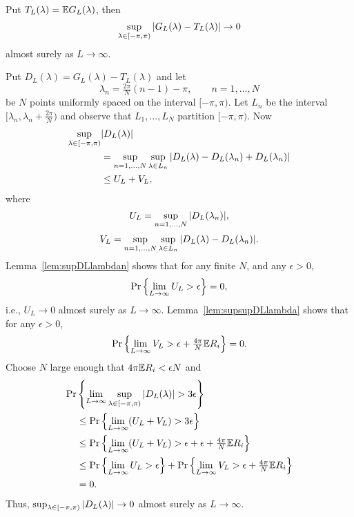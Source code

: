 \documentclass[journal]{IEEEtran}
\begin{document}
\begin{lemma}\label{lem:uniflawTGL} 
Put $T_L(\lambda) = {\mathbb E} G_L(\lambda)$, then
\[
\sup_{\lambda \in [-\pi, \pi)}{\vert G_L(\lambda) - T_L(\lambda) \vert} \rightarrow 0
\] 
almost surely as $L \rightarrow \infty$.
\end{lemma}
\begin{IEEEproof}
Put $D_L(\lambda) = G_L(\lambda) - T_L(\lambda)$ and let
\[
\lambda_n = \tfrac{2\pi}{N}(n-1) - \pi, \qquad n = 1, \dots, N
\]
be $N$ points uniformly spaced on the interval $[-\pi, \pi)$.  Let $L_n$ be the interval $[\lambda_n, \lambda_n + \tfrac{2\pi}{N})$ and observe that $L_1, \dots, L_N$ partition $[-\pi, \pi)$.  Now
\begin{align*}
\sup_{\lambda \in [-\pi, \pi)}&{\vert D_L(\lambda) \vert} \\
&= \sup_{n = 1,\dots,N}\sup_{\lambda \in L_n}{\vert D_L(\lambda) - D_L(\lambda_n) + D_L(\lambda_n) \vert} \\
&\leq U_L + V_L,
\end{align*}
where 
\[
U_L = \sup_{n = 1,\dots,N}{\vert D_L(\lambda_n) \vert},
\]
\[
V_L = \sup_{n = 1,\dots,N}\sup_{\lambda \in L_n}{\vert D_L(\lambda) - D_L(\lambda_n) \vert}.
\]
Lemma~\ref{lem:supDLlambdan} shows that for any finite $N$, and any $\epsilon > 0$, 
\[
{\operatorname{Pr}}\left\{ \lim_{L\rightarrow\infty} U_L > \epsilon \right\} = 0,
\]
i.e., $U_L \rightarrow 0$ almost surely as $L\rightarrow\infty$.  Lemma~\ref{lem:supsupDLlambda} shows that for any $\epsilon > 0$,
\[
{\operatorname{Pr}}\left\{ \lim_{L \rightarrow \infty} V_L > \epsilon + \tfrac{4\pi }{N}{\mathbb E} R_i \right\} = 0.
\] 
Choose $N$ large enough that $4\pi{\mathbb E} R_i < \epsilon N$ and
\begin{align*}
{\operatorname{Pr}}& \left\{ \lim_{L\rightarrow\infty} \sup_{\lambda \in [-\pi, \pi)}{\vert D_L(\lambda) \vert} > 3\epsilon \right\} \\
&\leq {\operatorname{Pr}}\left\{\lim_{L\rightarrow\infty}(U_L + V_L) > 3\epsilon \right\} \\
&\leq {\operatorname{Pr}}\left\{\lim_{L\rightarrow\infty} (U_L + V_L) > \epsilon + \epsilon + \tfrac{4\pi }{N}{\mathbb E} R_i \right\} \\
&\leq {\operatorname{Pr}}\left\{\lim_{L\rightarrow\infty} U_L > \epsilon\right\} +  {\operatorname{Pr}}\left\{ \lim_{L\rightarrow\infty} V_L > \epsilon + \tfrac{4\pi }{N}{\mathbb E} R_i \right\} \\
&= 0.
\end{align*}
Thus, $\sup_{\lambda \in [-\pi, \pi)}{\vert D_L(\lambda) \vert} \rightarrow 0$ almost surely as $L\rightarrow\infty$.
\end{IEEEproof}
\end{document}
